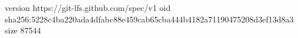 version https://git-lfs.github.com/spec/v1
oid sha256:5228c4ba220ada4dfabc88e459cab65cba444b4182a71190475208d3ef13d8a3
size 87544
